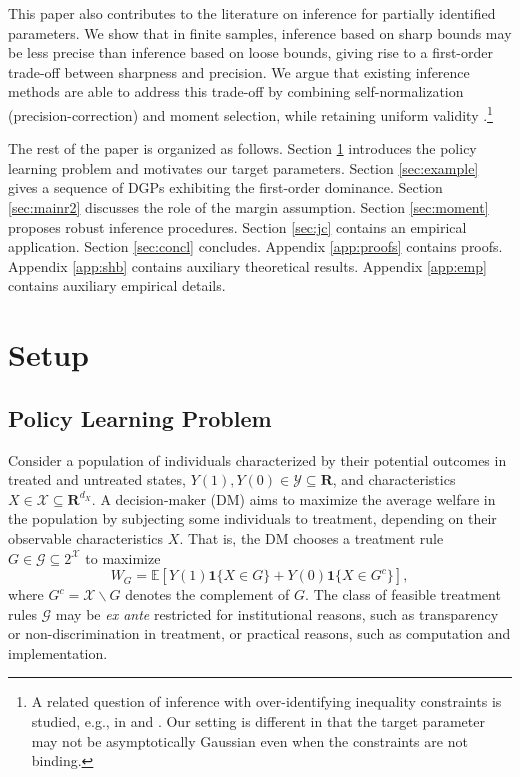\documentclass[12pt]{article}
\numberwithin{equation}{section}
\theoremstyle{plain}                         %
\theoremstyle{definition}                  %
\theoremstyle{remark}                      %
\newcommand{\E}{\mathbb{E}}
\begin{document}
This paper also contributes to the literature on inference for partially identified parameters. We show that in finite samples, inference based on sharp bounds may be less precise than inference based on loose bounds, giving rise to a first-order trade-off between sharpness and precision. We argue that existing inference methods are able to address this trade-off by combining self-normalization (precision-correction) and moment selection, while retaining uniform validity \citep[][]{andrews2010inference,CLR,romano2014practical,canay2017practical,bai2022two}.\footnote{A related question of inference with over-identifying inequality constraints is studied, e.g., in \citet{cox2024simple} and \citet{ketz2025short}. Our setting is different in that the target parameter may not be asymptotically Gaussian even when the constraints are not binding.}








The rest of the paper is organized as follows. Section \ref{sec:notation} introduces the policy learning problem and motivates our target parameters. Section \ref{sec:example} gives a sequence of DGPs exhibiting the first-order dominance. Section \ref{sec:mainr2} discusses the role of the margin assumption. Section \ref{sec:moment} proposes robust inference procedures. Section \ref{sec:jc} contains an empirical application. Section \ref{sec:concl} concludes. Appendix \ref{app:proofs} contains proofs. Appendix \ref{app:shb} contains auxiliary theoretical results. Appendix \ref{app:emp} contains auxiliary empirical details.



\section{Setup}
\label{sec:notation}

 \subsection{Policy Learning Problem}
\label{sec:model}
Consider a population of individuals characterized by their potential outcomes in treated and untreated states, $Y(1), Y(0) \in \mathcal{Y} \subseteq \mathbf{R}$, and characteristics $X \in \mathcal{X} \subseteq \mathbf{R}^{d_X}$. A decision-maker (DM) aims to maximize the average welfare in the population by subjecting some individuals to treatment, depending on their observable characteristics $X$. That is, the DM chooses a treatment rule $G \in \mathcal{G} \subseteq 2^\mathcal{X}$ to maximize
\begin{equation} \label{eq:wfbstar}
W_G = \E[ Y(1) \bm{1}\{ X \in G \} + Y(0) \bm{1}\{ X \in G^c \}],
\end{equation}
where $G^c = \mathcal{X} \backslash G$ denotes the complement of $G$. The class of feasible treatment rules $\mathcal{G}$ may be \textit{ex ante} restricted for institutional reasons, such as transparency or non-discrimination in treatment, or practical reasons, such as computation and implementation. 
\end{document}
